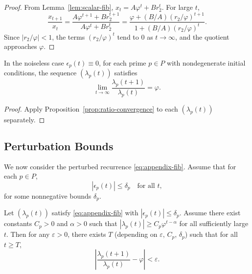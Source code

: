 \documentclass[11pt]{article}
\begin{document}
\begin{proof}
From Lemma~\ref{lem:scalar-fib}, $x_t = A \varphi^t + B r_2^t$.
For large $t$,
\[
\frac{x_{t+1}}{x_t}
= \frac{A \varphi^{t+1} + B r_2^{t+1}}{A \varphi^t + B r_2^t}
= \frac{\varphi + (B/A) (r_2/\varphi)^{t+1}}{1 + (B/A) (r_2/\varphi)^t}.
\]
Since $|r_2/\varphi|<1$, the terms $(r_2/\varphi)^t$ tend to $0$ as $t\to\infty$, and the quotient approaches $\varphi$.
\end{proof}

\begin{corollary}
\label{cor:componentwise-phi}
In the noiseless case $\epsilon_p(t)\equiv 0$, for each prime $p\in P$ with nondegenerate initial conditions, the sequence $(\lambda_p(t))$ satisfies
\[
\lim_{t\to\infty} \frac{\lambda_p(t+1)}{\lambda_p(t)} = \varphi.
\]
\end{corollary}

\begin{proof}
Apply Proposition~\ref{prop:ratio-convergence} to each $(\lambda_p(t))$ separately.
\end{proof}

\subsection{Perturbation Bounds}

We now consider the perturbed recurrence \eqref{eq:appendix-fib}.
Assume that for each $p\in P$,
\[
|\epsilon_p(t)| \leq \delta_p \quad \text{for all } t,
\]
for some nonnegative bounds $\delta_p$.

\begin{proposition}
\label{prop:perturbed-phi}
Let $(\lambda_p(t))$ satisfy \eqref{eq:appendix-fib} with $|\epsilon_p(t)|\leq \delta_p$.
Assume there exist constants $C_p>0$ and $\alpha>0$ such that $|\lambda_p(t)| \geq C_p \varphi^{t-\alpha}$ for all sufficiently large $t$.
Then for any $\varepsilon>0$, there exists $T$ (depending on $\varepsilon$, $C_p$, $\delta_p$) such that for all $t\geq T$,
\[
\left| \frac{\lambda_p(t+1)}{\lambda_p(t)} - \varphi \right| < \varepsilon.
\]
\end{proposition}
\end{document}
